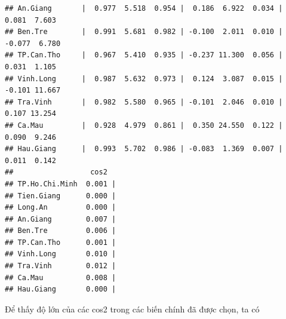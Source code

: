 \documentclass[../thesis.tex]{subfiles}
\begin{document}
\begin{verbatim}
## An.Giang       |  0.977  5.518  0.954 |  0.186  6.922  0.034 |  0.081  7.603
## Ben.Tre        |  0.991  5.681  0.982 | -0.100  2.011  0.010 | -0.077  6.780
## TP.Can.Tho     |  0.967  5.410  0.935 | -0.237 11.300  0.056 |  0.031  1.105
## Vinh.Long      |  0.987  5.632  0.973 |  0.124  3.087  0.015 | -0.101 11.667
## Tra.Vinh       |  0.982  5.580  0.965 | -0.101  2.046  0.010 |  0.107 13.254
## Ca.Mau         |  0.928  4.979  0.861 |  0.350 24.550  0.122 |  0.090  9.246
## Hau.Giang      |  0.993  5.702  0.986 | -0.083  1.369  0.007 |  0.011  0.142
##                  cos2  
## TP.Ho.Chi.Minh  0.001 |
## Tien.Giang      0.000 |
## Long.An         0.000 |
## An.Giang        0.007 |
## Ben.Tre         0.006 |
## TP.Can.Tho      0.001 |
## Vinh.Long       0.010 |
## Tra.Vinh        0.012 |
## Ca.Mau          0.008 |
## Hau.Giang       0.000 |
\end{verbatim}

\newpage
Để thấy độ lớn của các cos2 trong các biến chính đã được chọn, ta có

\begin{Shaded}
	\begin{Highlighting}[]
\OtherTok{\textless{}{-}}\SpecialCharTok{\%\textgreater{}\%}\SpecialCharTok{::}\NormalTok{()}
		\SpecialCharTok{$} \NormalTok{)}
\OtherTok{\textless{}{-}}\SpecialCharTok{\%\textgreater{}\%}\SpecialCharTok{::}\NormalTok{()}
		\SpecialCharTok{$} \NormalTok{)}
	\end{Highlighting}
\end{Shaded}
\end{document}
